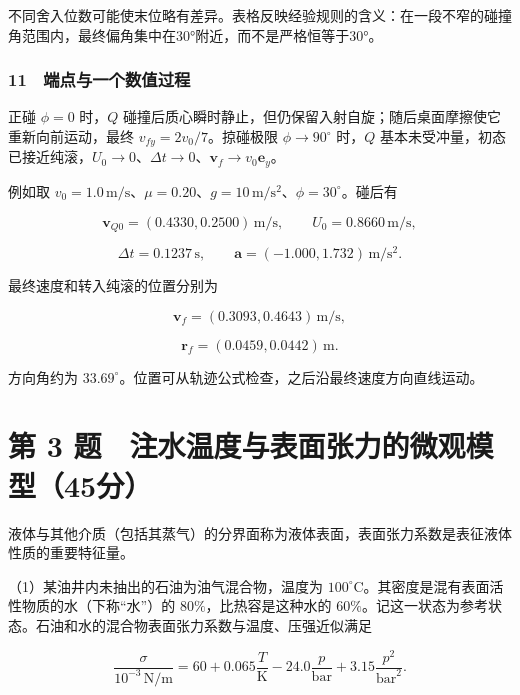 \documentclass[12pt,a4paper,fontset=fandol]{ctexart}
\begin{document}
不同舍入位数可能使末位略有差异。表格反映经验规则的含义：在一段不窄的碰撞角范围内，最终偏角集中在30°附近，而不是严格恒等于30°。

\noindent\begin{minipage}{\linewidth}
\subsubsection{11　端点与一个数值过程}\label{ux7aefux70b9ux4e0eux4e00ux4e2aux6570ux503cux8fc7ux7a0b}

正碰 \(\phi=0\) 时，\(Q\)
碰撞后质心瞬时静止，但仍保留入射自旋；随后桌面摩擦使它重新向前运动，最终
\(v_{fy}=2v_0/7\)。掠碰极限 \(\phi\to90^\circ\) 时，\(Q\)
基本未受冲量，初态已接近纯滚，\(U_0\to0\)、\(\Delta t\to0\)、\(\boldsymbol v_f\to v_0\boldsymbol e_y\)。

例如取
\(v_0=1.0\,\mathrm{m/s}\)、\(\mu=0.20\)、\(g=10\,\mathrm{m/s^2}\)、\(\phi=30^\circ\)。碰后有

\[\boldsymbol v_{Q0}=(0.4330,0.2500)\,\mathrm{m/s},
\qquad U_0=0.8660\,\mathrm{m/s},\]

\[\Delta t=0.1237\,\mathrm s,
\qquad\boldsymbol a=(-1.000,1.732)\,\mathrm{m/s^2}.\]

最终速度和转入纯滚的位置分别为

\[\boldsymbol v_f=(0.3093,0.4643)\,\mathrm{m/s},\]

\[\boldsymbol r_f=(0.0459,0.0442)\,\mathrm m.\]

方向角约为
\(33.69^\circ\)。位置可从轨迹公式检查，之后沿最终速度方向直线运动。


\end{minipage}

\clearpage

\section{第 3
题　注水温度与表面张力的微观模型（45分）}\label{ux7b2c-3-ux9898-ux6ce8ux6c34ux6e29ux5ea6ux4e0eux8868ux9762ux5f20ux529bux7684ux5faeux89c2ux6a21ux578b45ux5206}

液体与其他介质（包括其蒸气）的分界面称为液体表面，表面张力系数是表征液体性质的重要特征量。

（1）某油井内未抽出的石油为油气混合物，温度为
\(100^\circ\mathrm C\)。其密度是混有表面活性物质的水（下称``水''）的
\(80\%\)，比热容是这种水的
\(60\%\)。记这一状态为参考状态。石油和水的混合物表面张力系数与温度、压强近似满足

\[\frac\sigma{10^{-3}\,\mathrm{N/m}}
=60+0.065\frac T{\mathrm K}
-24.0\frac p{\mathrm{bar}}
+3.15\frac{p^2}{\mathrm{bar}^2}.\]
\end{document}
